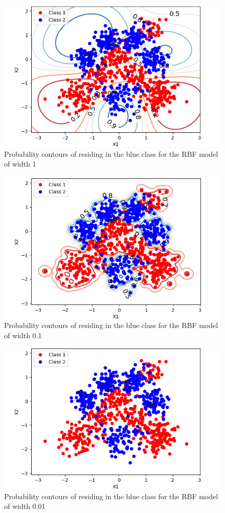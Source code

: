 \documentclass[twoside,twocolumn]{article}
\begin{document}
\begin{figure}[h]
  \centering
    \includegraphics[width=\linewidth]{l=1contour}
  \caption{Probability contours of residing in the blue class for the RBF model of width 1}
  \label{fig:c2}
\end{figure}
\begin{figure}[h]
  \centering
    \includegraphics[width=\linewidth]{l=0-1contour}
  \caption{Probability contours of residing in the blue class for the RBF model of width 0.1}
  \label{fig:c3}
\end{figure}
\begin{figure}[h]
  \centering
    \includegraphics[width=\linewidth]{l=0-01contour}
  \caption{Probability contours of residing in the blue class for the RBF model of width 0.01}
  \label{fig:c4}
\end{figure}
\end{document}
